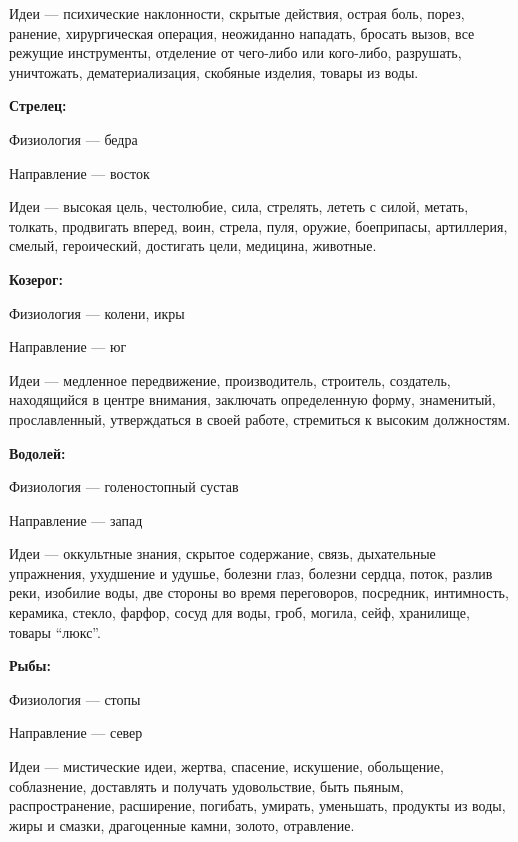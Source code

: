 \begin{myenum}[topsep=0]
\begin{mydescr}
			\item[Идеи] --- психические наклонности, скрытые действия, острая боль, порез, ранение, хирургическая операция, неожиданно нападать, бросать вызов, все режущие инструменты, отделение от чего-либо или кого-либо, разрушать, уничтожать, дематериализация, скобяные изделия, товары из воды.
		\end{mydescr}
	\item \textbf{Стрелец:}
		\begin{mydescr}
			\item[Физиология] --- бедра
			\item[Направление] --- восток
			\item[Идеи] --- высокая цель, честолюбие, сила, стрелять, лететь с силой, метать, толкать, продвигать вперед, воин, стрела, пуля, оружие, боеприпасы, артиллерия, смелый, героический, достигать цели, медицина, животные.
		\end{mydescr}
	\item \textbf{Козерог:}
		\begin{mydescr}
			\item[Физиология] --- колени, икры
			\item[Направление] --- юг
			\item[Идеи] --- медленное передвижение, производитель, строитель, создатель, находящийся в центре внимания, заключать определенную форму, знаменитый, прославленный, утверждаться в своей работе, стремиться к высоким должностям.
		\end{mydescr}
	\item \textbf{Водолей:}
		\begin{mydescr}
			\item[Физиология] --- голеностопный сустав
			\item[Направление] --- запад
			\item[Идеи] --- оккультные знания, скрытое содержание, связь, дыхательные упражнения, ухудшение и удушье, болезни глаз, болезни сердца, поток, разлив реки, изобилие воды, две стороны во время переговоров, посредник, интимность, керамика, стекло, фарфор, сосуд для воды, гроб, могила, сейф, хранилище, товары ``люкс''.
		\end{mydescr}
	\item \textbf{Рыбы:}
		\begin{mydescr}
			\item[Физиология] --- стопы
			\item[Направление] --- север
			\item[Идеи] --- мистические идеи, жертва, спасение, искушение, обольщение, соблазнение, доставлять и получать удовольствие, быть пьяным, распространение, расширение, погибать, умирать, уменьшать, продукты из воды, жиры и смазки, драгоценные камни, золото, отравление.
		\end{mydescr}
\end{myenum}
